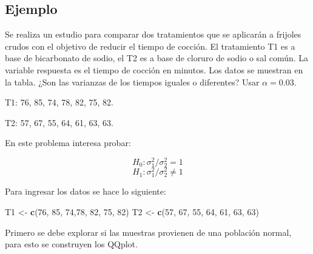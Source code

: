 \documentclass[10pt,]{krantz}
\makeatletter
\newenvironment{Shaded}{\begin{snugshade}}{\end{snugshade}}
\newcommand{\KeywordTok}[1]{\textcolor[rgb]{0.13,0.29,0.53}{\textbf{{#1}}}}
\newcommand{\DecValTok}[1]{\textcolor[rgb]{0.00,0.00,0.81}{{#1}}}
\newcommand{\StringTok}[1]{\textcolor[rgb]{0.31,0.60,0.02}{{#1}}}
\newcommand{\NormalTok}[1]{{#1}}
\newenvironment{kframe}{%
\medskip{}
\setlength{\fboxsep}{.8em}
 \def\at@end@of@kframe{}%
 \ifinner\ifhmode%
  \def\at@end@of@kframe{\end{minipage}}%
  \begin{minipage}{\columnwidth}%
 \fi\fi%
 \def\FrameCommand##1{\hskip\@totalleftmargin \hskip-\fboxsep
 \colorbox{shadecolor}{##1}\hskip-\fboxsep
     \hskip-\linewidth \hskip-\@totalleftmargin \hskip\columnwidth}%
 \MakeFramed {\advance\hsize-\width
   \@totalleftmargin\z@ \linewidth\hsize
   \@setminipage}}%
 {\par\unskip\endMakeFramed%
 \at@end@of@kframe}
\renewenvironment{Shaded}{\begin{kframe}}{\end{kframe}}
\makeatother
\begin{document}
\subsection*{Ejemplo}\label{ejemplo-65}


Se realiza un estudio para comparar dos tratamientos que se aplicarán a
frijoles crudos con el objetivo de reducir el tiempo de cocción. El
tratamiento T1 es a base de bicarbonato de sodio, el T2 es a base de
cloruro de sodio o sal común. La variable respuesta es el tiempo de
cocción en minutos. Los datos se muestran en la tabla. ¿Son las
varianzas de los tiempos iguales o diferentes? Usar \(\alpha=0.03\).

T1: 76, 85, 74, 78, 82, 75, 82.

T2: 57, 67, 55, 64, 61, 63, 63.

En este problema interesa probar:

\[H_0: \sigma_1^2 / \sigma_2^2 = 1\]
\[H_1: \sigma_1^2 / \sigma_2^2 \neq 1\]

Para ingresar los datos se hace lo siguiente:

\begin{Shaded}
\begin{Highlighting}[]
\NormalTok{T1 <-}\StringTok{ }\KeywordTok{c}\NormalTok{(}\DecValTok{76}\NormalTok{, }\DecValTok{85}\NormalTok{, }\DecValTok{74}\NormalTok{,}\DecValTok{78}\NormalTok{, }\DecValTok{82}\NormalTok{, }\DecValTok{75}\NormalTok{, }\DecValTok{82}\NormalTok{) }
\NormalTok{T2 <-}\StringTok{ }\KeywordTok{c}\NormalTok{(}\DecValTok{57}\NormalTok{, }\DecValTok{67}\NormalTok{, }\DecValTok{55}\NormalTok{, }\DecValTok{64}\NormalTok{, }\DecValTok{61}\NormalTok{, }\DecValTok{63}\NormalTok{, }\DecValTok{63}\NormalTok{)}
\end{Highlighting}
\end{Shaded}

Primero se debe explorar si las muestras provienen de una población
normal, para esto se construyen los QQplot.
\end{document}
